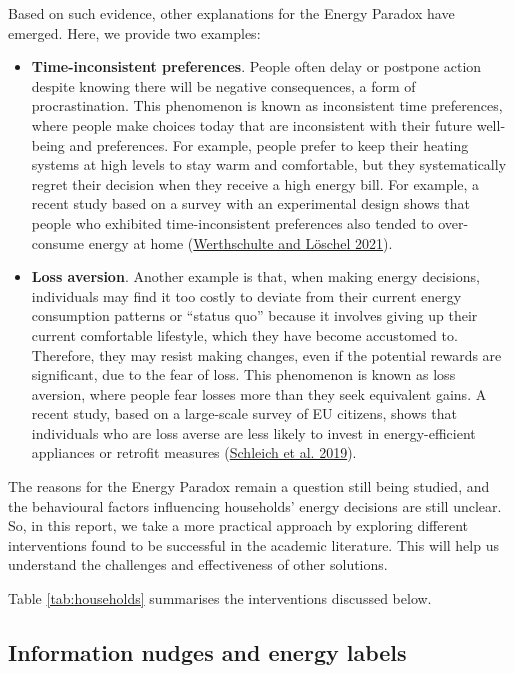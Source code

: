 \documentclass[
  11pt,
]{article}
\begin{document}
Based on such evidence, other explanations for the Energy Paradox have
emerged. Here, we provide two examples:

\begin{itemize}
\item
  \textbf{Time-inconsistent preferences}. People often delay or postpone
  action despite knowing there will be negative consequences, a form of
  procrastination. This phenomenon is known as inconsistent time
  preferences, where people make choices today that are inconsistent
  with their future well-being and preferences. For example, people
  prefer to keep their heating systems at high levels to stay warm and
  comfortable, but they systematically regret their decision when they
  receive a high energy bill. For example, a recent study based on a
  survey with an experimental design shows that people who exhibited
  time-inconsistent preferences also tended to over-consume energy at
  home (\protect\hyperlink{ref-werthschulte2021role}{Werthschulte and
  Löschel 2021}).
\item
  \textbf{Loss aversion}. Another example is that, when making energy
  decisions, individuals may find it too costly to deviate from their
  current energy consumption patterns or ``status quo'' because it
  involves giving up their current comfortable lifestyle, which they
  have become accustomed to. Therefore, they may resist making changes,
  even if the potential rewards are significant, due to the fear of
  loss. This phenomenon is known as loss aversion, where people fear
  losses more than they seek equivalent gains. A recent study, based on
  a large-scale survey of EU citizens, shows that individuals who are
  loss averse are less likely to invest in energy-efficient appliances
  or retrofit measures
  (\protect\hyperlink{ref-schleich2019large}{Schleich et al. 2019}).
\end{itemize}

The reasons for the Energy Paradox remain a question still being
studied, and the behavioural factors influencing households' energy
decisions are still unclear. So, in this report, we take a more
practical approach by exploring different interventions found to be
successful in the academic literature. This will help us understand the
challenges and effectiveness of other solutions.

Table \ref{tab:households} summarises the interventions discussed below.

\hypertarget{information-nudges-and-energy-labels}{%
\subsection{Information nudges and energy
labels}\label{information-nudges-and-energy-labels}}
\end{document}
